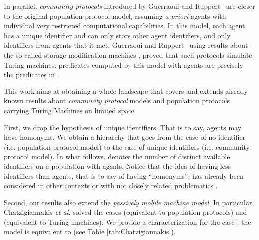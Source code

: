 \documentclass[UKenglish]{llncs}
\begin{document}
In parallel, \emph{community protocols} introduced by Guerraoui and
Ruppert~\cite{guerraoui2009names} are closer to the original
population protocol model, assuming \textit{a priori} agents with
individual very restricted computational capabilities.  In this model,
each agent has a unique
identifier and  can only store  other agent
identifiers, and only identifiers from agents that it met.  Guerraoui
and Ruppert~\cite{guerraoui2009names} using results about the
so-called storage modification machines \cite{schonhage1980storage},   proved
that such protocols 
simulate  Turing machines:  predicates computed by this
model with  agents are precisely the predicates in .


This work aims at obtaining a whole landscape that covers and extends
already known results about \emph{community protocol} models and
population protocols carrying Turing Machines on limited space.
  
First,   
we drop the hypothesis of unique identifiers. That is to say,  agents may have homonyms. We obtain a hierarchy that goes from the case of no
  identifier (i.e. population protocol
  model) to the case of unique identifiers (i.e. community protocol
  model). In what follows,  denotes the number of distinct available
  identifiers on a population with  agents.  Notice that the idea
  of having less identifiers than agents, that is to say of having ``homonyms'',  has already been considered
  in other contexts or with not closely related problematics 
  \cite{Delporte-Gallet:2011,Delporte-Gallet:2012,ArevaloAIJR12,Guiseppe2013}. 


Second, our results also extend the \emph{passively mobile
machine model}. In particular,
Chatzigiannakis \emph{et
  al.}  \cite{chatzigiannakis2011passively}  solved the cases
 (equivalent to population protocols) and
 (equivalent to Turing machines).
We provide a characterization for the case :
the model is equivalent to
   (see Table \ref{tab:Chatzigiannakis}).
\end{document}
